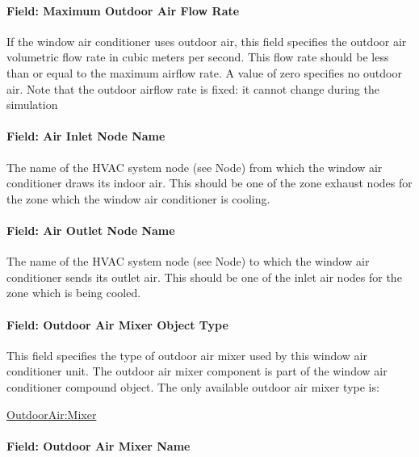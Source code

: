 \paragraph{Field: Maximum Outdoor Air Flow Rate}\label{field-maximum-outdoor-air-flow-rate-2-000}

If the window air conditioner uses outdoor air, this field specifies the outdoor air volumetric flow rate in cubic meters per second. This flow rate should be less than or equal to the maximum airflow rate. A value of zero specifies no outdoor air. Note that the outdoor airflow rate is fixed: it cannot change during the simulation

\paragraph{Field: Air Inlet Node Name}\label{field-air-inlet-node-name-4-002}

The name of the HVAC system node (see Node) from which the window air conditioner draws its indoor air. This should be one of the zone exhaust nodes for the zone which the window air conditioner is cooling.

\paragraph{Field: Air Outlet Node Name}\label{field-air-outlet-node-name-4-002}

The name of the HVAC system node (see Node) to which the window air conditioner sends its outlet air. This should be one of the inlet air nodes for the zone which is being cooled.

\paragraph{Field: Outdoor Air Mixer Object Type}\label{field-outdoor-air-mixer-object-type-1}

This field specifies the type of outdoor air mixer used by this window air conditioner unit. The outdoor air mixer component is part of the window air conditioner compound object. The only available outdoor air mixer type is:

\hyperref[outdoorairmixer]{OutdoorAir:Mixer}

\paragraph{Field: Outdoor Air Mixer Name}\label{field-outdoor-air-mixer-name-1}

